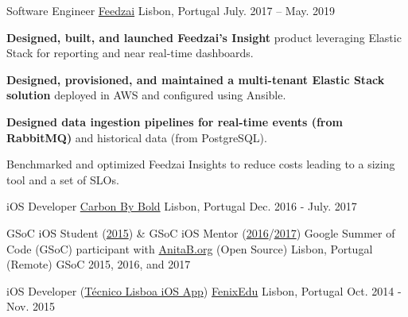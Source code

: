 \begin{cventries}
    
  \cventry
    {Software Engineer}
    {\href{https://feedzai.com/}{Feedzai}}
    {Lisbon, Portugal}
    {July. 2017 – May. 2019}
    {
      \begin{cvitems}
        \item \textbf{Designed, built, and launched Feedzai's Insight} product leveraging Elastic Stack for reporting and near real-time dashboards.
        \item \textbf{Designed, provisioned, and maintained a multi-tenant Elastic Stack solution} deployed in AWS and configured using Ansible.
        \item \textbf{Designed data ingestion pipelines for real-time events (from RabbitMQ)} and historical data (from PostgreSQL).
        \item Benchmarked and optimized Feedzai Insights to reduce costs leading to a sizing tool and a set of SLOs.
      \end{cvitems}
      \vspace{4mm}
    }

  \cventryShort
    {iOS Developer}
    {\href{https://www.carbonbybold.com/pt-pt/}{Carbon By Bold}}
    {Lisbon, Portugal}
    {Dec. 2016 - July. 2017}

  \cventryShort
    {GSoC iOS Student (\href{https://docs.google.com/presentation/d/1yv4XuNNpTgDkyOjL9SSjGe7PSZuwpbah42mQCACxdXQ/}{2015}) \& GSoC iOS Mentor (\href{https://summerofcode.withgoogle.com/archive/2016/projects/5509901874888704/}{2016}/\href{https://summerofcode.withgoogle.com/archive/2017/projects/5508656065937408/}{2017})}
    {Google Summer of Code (GSoC) participant with \href{http://anitaborg.org/}{AnitaB.org} (Open Source)}
    {Lisbon, Portugal (Remote)}
    {GSoC 2015, 2016, and 2017}
    
  \cventryShort
    {iOS Developer (\href{https://apps.apple.com/us/app/tecnico-lisboa/id959976468}{Técnico Lisboa iOS App})}
    {\href{http://fenixedu.org/}{FenixEdu}}
    {Lisbon, Portugal}
    {Oct. 2014 - Nov. 2015}

\end{cventries}
